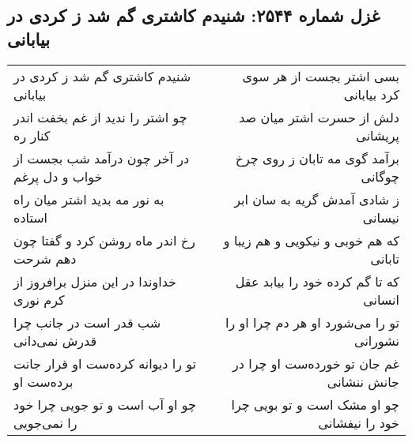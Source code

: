 \begin{center}
\section*{غزل شماره ۲۵۴۴: شنیدم کاشتری گم شد ز کردی در بیابانی}
\label{sec:2544}
\begin{longtable}{l p{0.5cm} r}
شنیدم کاشتری گم شد ز کردی در بیابانی
&&
بسی اشتر بجست از هر سوی کرد بیابانی
\\
چو اشتر را ندید از غم بخفت اندر کنار ره
&&
دلش از حسرت اشتر میان صد پریشانی
\\
در آخر چون درآمد شب بجست از خواب و دل پرغم
&&
برآمد گوی مه تابان ز روی چرخ چوگانی
\\
به نور مه بدید اشتر میان راه استاده
&&
ز شادی آمدش گریه به سان ابر نیسانی
\\
رخ اندر ماه روشن کرد و گفتا چون دهم شرحت
&&
که هم خوبی و نیکویی و هم زیبا و تابانی
\\
خداوندا در این منزل برافروز از کرم نوری
&&
که تا گم کرده خود را بیابد عقل انسانی
\\
شب قدر است در جانب چرا قدرش نمی‌دانی
&&
تو را می‌شورد او هر دم چرا او را نشورانی
\\
تو را دیوانه کرده‌ست او قرار جانت برده‌ست او
&&
غم جان تو خورده‌ست او چرا در جانش ننشانی
\\
چو او آب است و تو جویی چرا خود را نمی‌جویی
&&
چو او مشک است و تو بویی چرا خود را نیفشانی
\\
\end{longtable}
\end{center}
